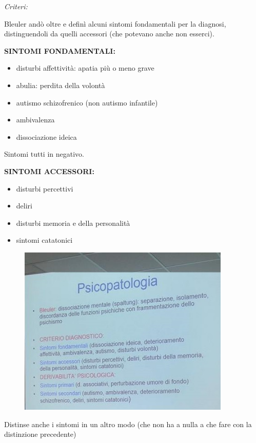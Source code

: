 \emph{\emph{Criteri:}}

Bleuler andò oltre e definì alcuni sintomi fondamentali per la diagnosi,
distinguendoli da quelli accessori (che potevano anche non esserci).

\textbf{SINTOMI FONDAMENTALI:}

\begin{itemize}
\item
  disturbi affettività: apatia più o meno grave
\item
  abulia: perdita della volontà
\item
  autismo schizofrenico (non autismo infantile)
\item
  ambivalenza
\item
  dissociazione ideica
\end{itemize}

Sintomi tutti in negativo.

\textbf{SINTOMI ACCESSORI:}
\begin{itemize}
\item disturbi percettivi
\item deliri
\item disturbi memoria e della personalità
\item sintomi catatonici
\end{itemize}

\begin{figure}[!ht]
\centering
	\includegraphics[width=0.9\textwidth]{06/image2.jpeg}
\end{figure}

Distinse anche i sintomi in un altro modo (che non ha a nulla a che fare
con la distinzione precedente)

